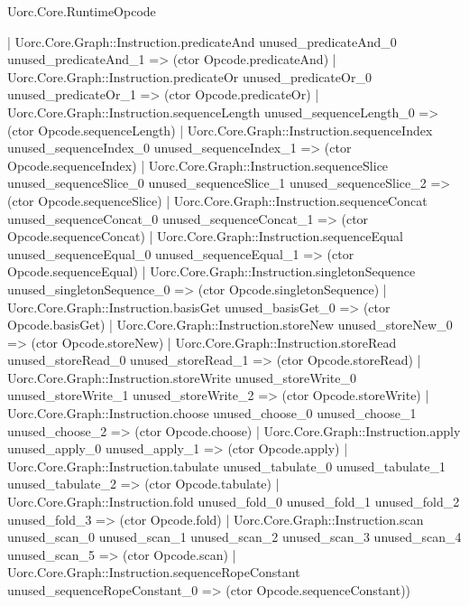 \begin{lexlean}{Uorc.Core.RuntimeOpcode}
\begin{semanticmodule}
{    | Uorc.Core.Graph::Instruction.predicateAnd unused_predicateAnd_0 unused_predicateAnd_1 => (ctor Opcode.predicateAnd)
    | Uorc.Core.Graph::Instruction.predicateOr unused_predicateOr_0 unused_predicateOr_1 => (ctor Opcode.predicateOr)
    | Uorc.Core.Graph::Instruction.sequenceLength unused_sequenceLength_0 => (ctor Opcode.sequenceLength)
    | Uorc.Core.Graph::Instruction.sequenceIndex unused_sequenceIndex_0 unused_sequenceIndex_1 => (ctor Opcode.sequenceIndex)
    | Uorc.Core.Graph::Instruction.sequenceSlice unused_sequenceSlice_0 unused_sequenceSlice_1 unused_sequenceSlice_2 => (ctor Opcode.sequenceSlice)
    | Uorc.Core.Graph::Instruction.sequenceConcat unused_sequenceConcat_0 unused_sequenceConcat_1 => (ctor Opcode.sequenceConcat)
    | Uorc.Core.Graph::Instruction.sequenceEqual unused_sequenceEqual_0 unused_sequenceEqual_1 => (ctor Opcode.sequenceEqual)
    | Uorc.Core.Graph::Instruction.singletonSequence unused_singletonSequence_0 => (ctor Opcode.singletonSequence)
    | Uorc.Core.Graph::Instruction.basisGet unused_basisGet_0 => (ctor Opcode.basisGet)
    | Uorc.Core.Graph::Instruction.storeNew unused_storeNew_0 => (ctor Opcode.storeNew)
    | Uorc.Core.Graph::Instruction.storeRead unused_storeRead_0 unused_storeRead_1 => (ctor Opcode.storeRead)
    | Uorc.Core.Graph::Instruction.storeWrite unused_storeWrite_0 unused_storeWrite_1 unused_storeWrite_2 => (ctor Opcode.storeWrite)
    | Uorc.Core.Graph::Instruction.choose unused_choose_0 unused_choose_1 unused_choose_2 => (ctor Opcode.choose)
    | Uorc.Core.Graph::Instruction.apply unused_apply_0 unused_apply_1 => (ctor Opcode.apply)
    | Uorc.Core.Graph::Instruction.tabulate unused_tabulate_0 unused_tabulate_1 unused_tabulate_2 => (ctor Opcode.tabulate)
    | Uorc.Core.Graph::Instruction.fold unused_fold_0 unused_fold_1 unused_fold_2 unused_fold_3 => (ctor Opcode.fold)
    | Uorc.Core.Graph::Instruction.scan unused_scan_0 unused_scan_1 unused_scan_2 unused_scan_3 unused_scan_4 unused_scan_5 => (ctor Opcode.scan)
    | Uorc.Core.Graph::Instruction.sequenceRopeConstant unused_sequenceRopeConstant_0 => (ctor Opcode.sequenceConstant))
}


\end{semanticmodule}
\end{lexlean}
